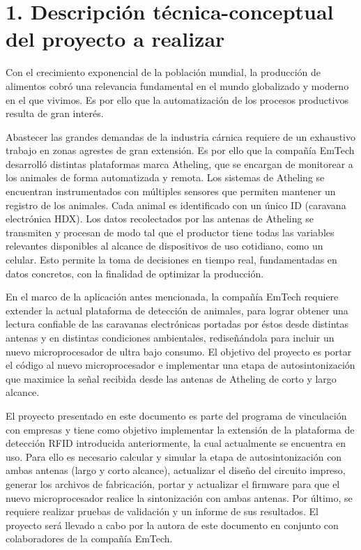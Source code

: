 \documentclass[
11pt, %
]{charter}
\begin{document}
\section{1. Descripción técnica-conceptual del proyecto a realizar}
\label{sec:descripcion}

Con el crecimiento exponencial de la población mundial, la producción de alimentos cobró una relevancia fundamental en el mundo globalizado y moderno en el que vivimos. Es por ello que la automatización de los procesos productivos resulta de gran interés. 

Abastecer las grandes demandas de la industria cárnica requiere de un exhaustivo trabajo en zonas agrestes de gran extensión. Es por ello que la compañía EmTech desarrolló distintas plataformas marca Atheling, que se encargan de monitorear a los animales de forma automatizada y remota. Los sistemas de Atheling se encuentran instrumentados con múltiples sensores que permiten mantener un registro de los animales. Cada animal es identificado con un único ID (caravana electrónica HDX). Los datos recolectados por las antenas de Atheling se transmiten y procesan de modo tal que el productor tiene todas las variables relevantes disponibles al alcance de dispositivos de uso cotidiano, como un celular. Esto permite la toma de decisiones en tiempo real, fundamentadas en datos concretos, con la finalidad de optimizar la producción.  

En el marco de la aplicación antes mencionada, la compañía EmTech requiere extender la actual plataforma de detección de animales, para lograr obtener una lectura confiable de las caravanas electrónicas portadas por éstos desde distintas antenas y en distintas condiciones ambientales, rediseñándola para incluir un nuevo microprocesador de ultra bajo consumo. El objetivo del proyecto es portar el código al nuevo microprocesador e implementar una etapa de autosintonización que maximice la señal recibida desde las antenas de Atheling de corto y largo alcance. 

El proyecto presentado en este documento es parte del programa de vinculación con empresas y tiene como objetivo implementar la extensión de la plataforma de detección RFID introducida anteriormente, la cual actualmente se encuentra en uso. Para ello es necesario calcular y simular la etapa de autosintonización con ambas antenas (largo y corto alcance), actualizar el diseño del circuito impreso, generar los archivos de fabricación, portar y actualizar el firmware para que el nuevo microprocesador realice la sintonización con ambas antenas. Por último, se requiere realizar pruebas de validación y un informe de sus resultados. El proyecto será llevado a cabo por la autora de este documento en conjunto con colaboradores de la compañía EmTech.
\end{document}
